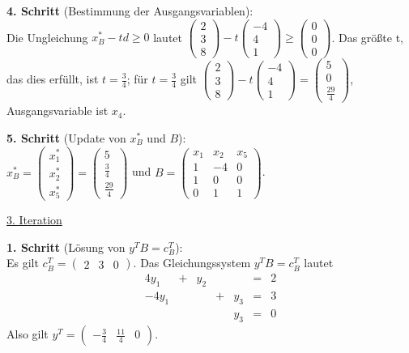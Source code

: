 \documentclass[10pt,a4paper,oneside,ngerman,numbers=noenddot]{scrartcl}
\begin{document}
		\textbf{4. Schritt} (Bestimmung der Ausgangsvariablen):\\
		Die Ungleichung $x_{B}^{*} - td \geq 0$ lautet $\begin{pmatrix} 2 \\ 3 \\ 8\end{pmatrix} - t \begin{pmatrix}-4 \\ 4 \\ 1 \end{pmatrix} \geq \begin{pmatrix} 0 \\ 0 \\ 0 \end{pmatrix}$. Das größte t, das dies erfüllt, ist $t = \frac{3}{4}$; für $t = \frac{3}{4}$ gilt $\begin{pmatrix} 2 \\ 3 \\ 8\end{pmatrix} - t \begin{pmatrix}-4 \\ 4 \\ 1 \end{pmatrix} = \begin{pmatrix} 5 \\ 0 \\ \frac{29}{4} \end{pmatrix}$, Ausgangsvariable ist $x_{4}$.
		
		\textbf{5. Schritt} (Update von $x_{B}^{*}$ und $B$):\\
		$x_{B}^{*} = \begin{pmatrix} x_{1}^{*} \\ x_{2}^{*} \\ x_{5}^{*} \end{pmatrix} = \begin{pmatrix} 5 \\ \frac{3}{4} \\ \frac{29}{4} \end{pmatrix}$ und $B = \begin{pmatrix} x_{1} & x_{2} & x_{5} \\ 1 & -4 & 0 \\ 1 & 0 & 0 \\ 0 & 1 & 1 \end{pmatrix}$.
		
		\underline{3. Iteration}
		
		\textbf{1. Schritt} (Lösung von $y^{T}B = c_{B}^{T}$):\\
		Es gilt $c_{B}^{T} = \begin{pmatrix} 2 & 3 & 0 \end{pmatrix}$. Das Gleichungssystem $y^{T}B = c_{B}^{T}$ lautet
		\begin{alignat*}{4}
			y_{1} &+& y_{2} && &=& 2 \\
			-4y_{1} && &+& y_{3} &=& 3 \\
			&& && y_{3} &=& 0
		\end{alignat*}
		Also gilt $y^{T} = \begin{pmatrix} -\frac{3}{4} & \frac{11}{4} & 0 \end{pmatrix}$.
		
\end{document}
